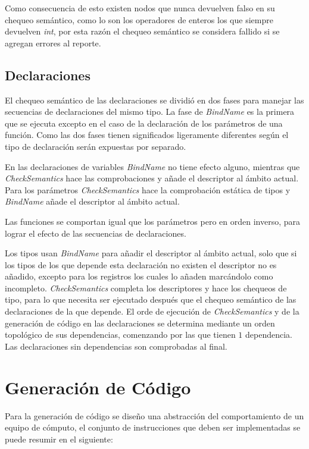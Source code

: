 \documentclass[a4paper,10pt]{article}
\begin{document}
		Como consecuencia de esto existen nodos que nunca devuelven falso en su chequeo semántico, como lo son los operadores de enteros los que siempre devuelven \textit{int}, por esta razón el chequeo semántico se considera fallido si se agregan errores al reporte.
		
		\subsection{Declaraciones}
		
		El chequeo semántico de las declaraciones se dividió en dos fases para manejar las secuencias de declaraciones del mismo tipo.
		La fase de \textit{BindName} es la primera que se ejecuta excepto en el caso de la declaración de los parámetros de una función.
		Como las dos fases tienen significados ligeramente diferentes según el tipo de declaración serán expuestas por separado.
		
		En las declaraciones de variables \textit{BindName} no tiene efecto alguno, mientras que \textit{CheckSemantics} hace las comprobaciones y añade el descriptor al ámbito actual. Para los parámetros \textit{CheckSemantics} hace la comprobación estática de tipos y \textit{BindName} añade el descriptor al ámbito actual.
		
		Las funciones se comportan igual que los parámetros pero en orden inverso, para lograr el efecto de las secuencias de declaraciones.
		
		Los tipos usan \textit{BindName} para añadir el descriptor al ámbito actual, solo que si los tipos de los que depende esta declaración no existen el descriptor no es añadido, excepto para los registros los cuales lo añaden marcándolo como incompleto. \textit{CheckSemantics} completa los descriptores y hace los chequeos de tipo, para lo que necesita ser ejecutado después que el chequeo semántico de las declaraciones de la que depende. El orde de ejecución de \textit{CheckSemantics} y de la generación de código en las declaraciones se determina mediante un orden topológico de sus dependencias, comenzando por las que tienen $1$ dependencia. Las declaraciones sin dependencias son comprobadas al final.
		
		\section{Generación de Código}
		
		Para la generación de código se diseño una abstracción del comportamiento de un equipo de cómputo, el conjunto de instrucciones que deben ser implementadas se puede resumir en el siguiente:
		
\end{document}

